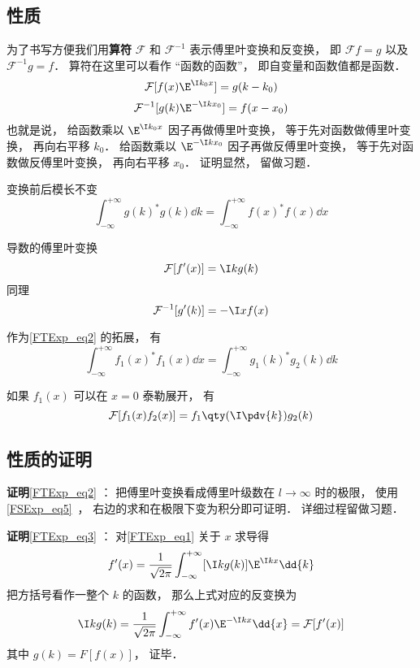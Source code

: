 \subsection{性质}
为了书写方便我们用\textbf{算符} $\mathcal F$ 和 $\mathcal F^{-1}$ 表示傅里叶变换和反变换， 即 $\mathcal F f = g$ 以及 $\mathcal F^{-1} g = f$． 算符在这里可以看作 “函数的函数”， 即自变量和函数值都是函数．
\begin{equation}\label{FTExp_eq4}
\mathcal F [f(x) \E^{\I k_0 x}] = g(k - k_0)
\end{equation}
\begin{equation}\label{FTExp_eq7}
\mathcal F^{-1} [g(k) \E^{-\I k x_0}] = f(x - x_0)
\end{equation}
也就是说， 给函数乘以 $\E^{\I k_0 x}$ 因子再做傅里叶变换， 等于先对函数做傅里叶变换， 再向右平移 $k_0$． 给函数乘以 $\E^{-\I k x_0}$ 因子再做反傅里叶变换， 等于先对函数做反傅里叶变换， 再向右平移 $x_0$． 证明显然， 留做习题．

变换前后模长不变
\begin{equation}\label{FTExp_eq2}
\int_{-\infty}^{+\infty} g(k)^* g(k) \dd{k} = \int_{-\infty}^{+\infty} f(x)^* f(x) \dd{x}
\end{equation}

导数的傅里叶变换
\begin{equation}\label{FTExp_eq3}
\mathcal F [f'(x)] = \I k g(k)
\end{equation}
同理
\begin{equation}
\mathcal F^{-1} [g'(k)] = -\I x f(x)
\end{equation}

作为\autoref{FTExp_eq2} 的拓展， 有
\begin{equation}
\int_{-\infty}^{+\infty} f_1(x)^* f_1(x) \dd{x} = \int_{-\infty}^{+\infty} g_1(k)^* g_2(k) \dd{k}
\end{equation}

如果 $f_1(x)$ 可以在 $x = 0$ 泰勒展开， 有
\begin{equation}\label{FTExp_eq8}
\mathcal{F}[f_1(x) f_2(x)] = f_1\qty(\I \pdv{k}) g_2(k)
\end{equation}

\subsection{性质的证明}

\textbf{证明}\autoref{FTExp_eq2} ： 把傅里叶变换看成傅里叶级数在 $l \to \infty$ 时的极限， 使用\autoref{FSExp_eq5}~， 右边的求和在极限下变为积分即可证明． 详细过程留做习题．

\textbf{证明}\autoref{FTExp_eq3} ： 对\autoref{FTExp_eq1} 关于 $x$ 求导得
\begin{equation}
f'(x) = \frac{1}{\sqrt{2\pi }} \int_{-\infty }^{+\infty } [\I kg(k)]\E^{\I kx} \dd{k}
\end{equation}
把方括号看作一整个 $k$ 的函数， 那么上式对应的反变换为
\begin{equation}
\I kg(k) = \frac{1}{\sqrt{2\pi }} \int_{-\infty }^{+\infty } f'(x) \E^{-\I kx} \dd{x} = \mathcal F [f'(x)]
\end{equation}
其中 $g(k) = F [f(x)]$， 证毕．

